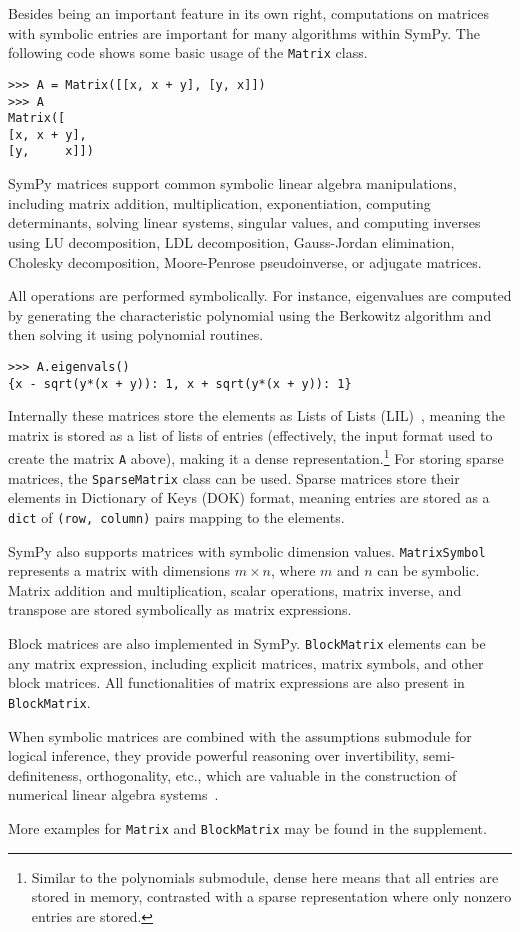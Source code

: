 Besides being an important feature in its own right, computations on
matrices with symbolic entries are important for many algorithms
within SymPy.  The following code shows some basic usage of the
\texttt{Matrix} class.
\begin{verbatim}
>>> A = Matrix([[x, x + y], [y, x]])
>>> A
Matrix([
[x, x + y],
[y,     x]])
\end{verbatim}

SymPy matrices support common symbolic linear algebra manipulations, including
matrix addition, multiplication, exponentiation, computing determinants,
solving linear systems, singular values, and computing inverses using LU
decomposition, LDL decomposition, Gauss-Jordan elimination, Cholesky
decomposition, Moore-Penrose pseudoinverse, or adjugate matrices.

All operations are performed symbolically. For instance, eigenvalues are computed
by generating the characteristic polynomial using the Berkowitz algorithm and
then solving it using polynomial routines.

\begin{verbatim}
>>> A.eigenvals()
{x - sqrt(y*(x + y)): 1, x + sqrt(y*(x + y)): 1}
\end{verbatim}

Internally these matrices store the elements as Lists of Lists (LIL)~\cite{scipy}, meaning
the matrix is stored as a list of lists of entries (effectively, the
input format used to create the matrix \texttt{A} above), making it a
dense representation.\footnote{Similar to the polynomials submodule, dense here
  means that all entries are stored in memory, contrasted with a sparse
  representation where only nonzero entries are stored.} For storing sparse
matrices, the \verb|SparseMatrix| class can be used. Sparse matrices store
their elements in Dictionary of Keys (DOK) format, meaning entries are stored
as a \texttt{dict} of \texttt{(row, column)} pairs mapping to the elements.

SymPy also supports matrices with symbolic dimension values. \verb|MatrixSymbol|
represents a matrix with dimensions $m\times n$, where $m$ and $n$ can be
symbolic. Matrix addition and multiplication, scalar operations, matrix inverse,
and transpose are stored symbolically as matrix expressions.

Block matrices are also implemented in SymPy. \verb|BlockMatrix| elements can
be any matrix expression, including explicit matrices, matrix symbols, and
other block matrices. All functionalities of matrix expressions are also
present in \verb|BlockMatrix|.

When symbolic matrices are combined with the assumptions submodule for logical
inference, they provide powerful reasoning over invertibility,
semi-definiteness, orthogonality, etc., which are valuable in the construction
of numerical linear algebra systems~\cite{rocklin2013mathematically}.

More examples for \verb|Matrix| and \verb|BlockMatrix| may be found in the
supplement.
